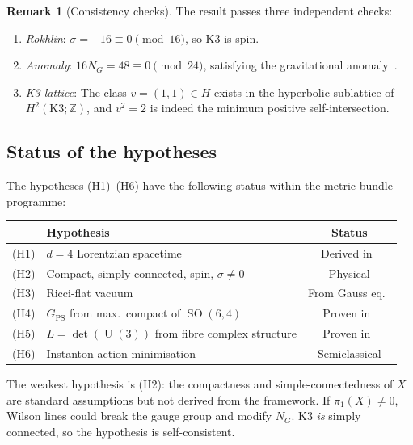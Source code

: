 \documentclass[12pt,a4paper]{article}
\theoremstyle{definition}
\newtheorem{remark}[theorem]{Remark}
\newcommand{\SO}{\operatorname{SO}}
\newcommand{\U}{\operatorname{U}}
\newcommand{\Z}{\mathbb{Z}}
\begin{document}
\begin{remark}[Consistency checks]
The result passes three independent checks:
\begin{enumerate}[nosep]
\item \emph{Rokhlin}: $\sigma = -16 \equiv 0 \pmod{16}$, so K3 is spin. \checkmark
\item \emph{Anomaly}: $16 N_G = 48 \equiv 0 \pmod{24}$, satisfying the gravitational anomaly~\cite{Paper4}. \checkmark
\item \emph{K3 lattice}: The class $v = (1,1) \in H$ exists in the hyperbolic sublattice of $H^2(\mathrm{K3}; \Z)$, and $v^2 = 2$ is indeed the minimum positive self-intersection. \checkmark
\end{enumerate}
\end{remark}

\subsection{Status of the hypotheses}

The hypotheses (H1)--(H6) have the following status within the metric bundle programme:

\begin{center}
\renewcommand{\arraystretch}{1.3}
\begin{tabular}{clc}
\toprule
& \textbf{Hypothesis} & \textbf{Status} \\
\midrule
(H1) & $d = 4$ Lorentzian spacetime & Derived in~\cite{Paper6} \\
(H2) & Compact, simply connected, spin, $\sigma \neq 0$ & Physical \\
(H3) & Ricci-flat vacuum & From Gauss eq.~\cite{Paper3} \\
(H4) & $G_{\mathrm{PS}}$ from max.\ compact of $\SO(6,4)$ & Proven in~\cite{Paper1} \\
(H5) & $L = \det(\U(3))$ from fibre complex structure & Proven in~\cite{Paper1} \\
(H6) & Instanton action minimisation & Semiclassical \\
\bottomrule
\end{tabular}
\end{center}

The weakest hypothesis is (H2): the compactness and simple-connectedness of $X$ are standard assumptions but not derived from the framework.
If $\pi_1(X) \neq 0$, Wilson lines could break the gauge group and modify $N_G$.
K3 \emph{is} simply connected, so the hypothesis is self-consistent.
\end{document}
